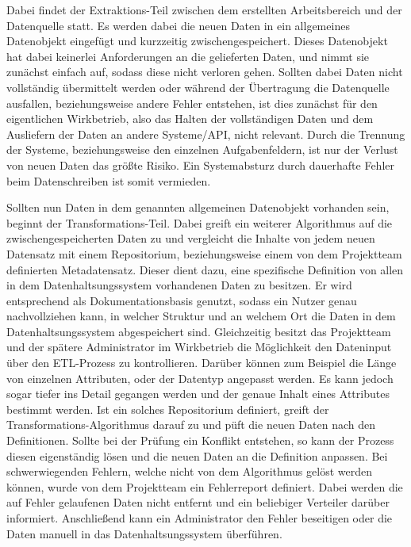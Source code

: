 {Dabei findet der Extraktions\hyp{}Teil zwischen dem erstellten Arbeitsbereich
und der Datenquelle statt. Es werden dabei die neuen Daten in ein allgemeines
Datenobjekt eingefügt und kurzzeitig zwischengespeichert. Dieses Datenobjekt
hat dabei keinerlei Anforderungen an die gelieferten Daten, und nimmt sie
zunächst einfach auf, sodass diese nicht verloren gehen. Sollten dabei Daten
nicht vollständig übermittelt werden oder während der Übertragung die
Datenquelle ausfallen, beziehungsweise andere Fehler entstehen, ist dies
zunächst für den eigentlichen Wirkbetrieb, also das Halten der vollständigen
Daten und dem Ausliefern der Daten an andere Systeme/API, nicht relevant.
Durch die Trennung der Systeme, beziehungsweise den einzelnen Aufgabenfeldern,
ist nur der Verlust von neuen Daten das größte Risiko. Ein Systemabsturz durch
dauerhafte Fehler beim Datenschreiben ist somit vermieden.

Sollten nun Daten in dem genannten allgemeinen Datenobjekt vorhanden sein,
beginnt der Transformations\hyp{}Teil. Dabei greift ein weiterer Algorithmus
auf die zwischengespeicherten Daten zu und vergleicht die Inhalte von jedem
neuen Datensatz mit einem \gls{Repositorium}, beziehungsweise einem von dem
Projektteam definierten Metadatensatz. Dieser dient dazu, eine spezifische
Definition von allen in dem Datenhaltsungssystem vorhandenen Daten zu besitzen.
Er wird entsprechend als Dokumentationsbasis genutzt, sodass ein Nutzer genau
nachvollziehen kann, in welcher Struktur und an welchem Ort die Daten in dem
Datenhaltsungssystem abgespeichert sind. Gleichzeitig besitzt das Projektteam
und der spätere Administrator im Wirkbetrieb die Möglichkeit den Dateninput
über den ETL\hyp{}Prozess zu kontrollieren. Darüber können zum Beispiel die
Länge von einzelnen Attributen, oder der Datentyp angepasst werden. Es kann
jedoch sogar tiefer ins Detail gegangen werden und der genaue Inhalt eines
Attributes bestimmt werden. Ist ein solches \gls{Repositorium} definiert,
greift der Transformations\hyp{}Algorithmus darauf zu und püft die neuen Daten
nach den Definitionen. Sollte bei der Prüfung ein Konflikt entstehen, so kann
der Prozess diesen eigenständig lösen und die neuen Daten an die Definition
anpassen. Bei schwerwiegenden Fehlern, welche nicht von dem Algorithmus
gelöst werden können, wurde von dem Projektteam ein Fehlerreport definiert.
Dabei werden die auf Fehler gelaufenen Daten nicht entfernt und ein
beliebiger Verteiler darüber informiert. Anschließend kann ein Administrator
den Fehler beseitigen oder die Daten manuell in das Datenhaltsungssystem
überführen.

}
